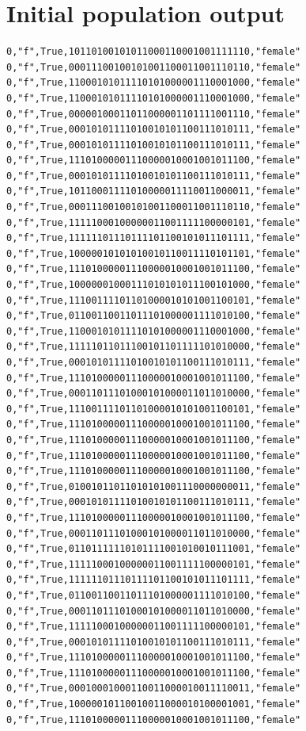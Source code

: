 \documentclass[authoryearcitations]{UoYCSproject}
\begin{document}
\section{Initial population output}
\begin{framed}
\begin{verbatim}
0,"f",True,10110100101011000110001001111110,"female"
0,"f",True,00011100100101001100011001110110,"female"
0,"f",True,11000101011110101000001110001000,"female"
0,"f",True,11000101011110101000001110001000,"female"
0,"f",True,00000100011011000001101111001110,"female"
0,"f",True,00010101111010010101100111010111,"female"
0,"f",True,00010101111010010101100111010111,"female"
0,"f",True,11101000001110000010001001011100,"female"
0,"f",True,00010101111010010101100111010111,"female"
0,"f",True,10110001111010000011110011000011,"female"
0,"f",True,00011100100101001100011001110110,"female"
0,"f",True,11111000100000011001111100000101,"female"
0,"f",True,11111101110111101100101011101111,"female"
0,"f",True,10000010101010010110011110101101,"female"
0,"f",True,11101000001110000010001001011100,"female"
0,"f",True,10000001000111010101011100101000,"female"
0,"f",True,11100111101101000010101001100101,"female"
0,"f",True,01100110011011101000001111010100,"female"
0,"f",True,11000101011110101000001110001000,"female"
0,"f",True,11111011011100101101111101010000,"female"
0,"f",True,00010101111010010101100111010111,"female"
0,"f",True,11101000001110000010001001011100,"female"
0,"f",True,00011011101000101000011011010000,"female"
0,"f",True,11100111101101000010101001100101,"female"
0,"f",True,11101000001110000010001001011100,"female"
0,"f",True,11101000001110000010001001011100,"female"
0,"f",True,11101000001110000010001001011100,"female"
0,"f",True,11101000001110000010001001011100,"female"
0,"f",True,01001011011010101001110000000011,"female"
0,"f",True,00010101111010010101100111010111,"female"
0,"f",True,11101000001110000010001001011100,"female"
0,"f",True,00011011101000101000011011010000,"female"
0,"f",True,01101111110101111001010010111001,"female"
0,"f",True,11111000100000011001111100000101,"female"
0,"f",True,11111101110111101100101011101111,"female"
0,"f",True,01100110011011101000001111010100,"female"
0,"f",True,00011011101000101000011011010000,"female"
0,"f",True,11111000100000011001111100000101,"female"
0,"f",True,00010101111010010101100111010111,"female"
0,"f",True,11101000001110000010001001011100,"female"
0,"f",True,11101000001110000010001001011100,"female"
0,"f",True,00010001000110011000010011110011,"female"
0,"f",True,10000010110010011000010100001001,"female"
0,"f",True,11101000001110000010001001011100,"female"

\end{verbatim}
\end{framed}
\end{document}

